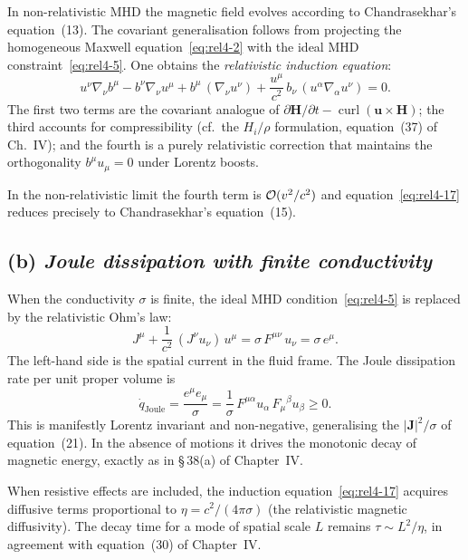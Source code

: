 In non-relativistic MHD the magnetic field evolves according to
Chandrasekhar's equation~(13).  The covariant generalisation follows from
projecting the homogeneous Maxwell equation~\eqref{eq:rel4-2} with the
ideal MHD constraint~\eqref{eq:rel4-5}.  One obtains the \emph{relativistic
induction equation}:
\begin{equation}\label{eq:rel4-17}
  \boxed{
  u^{\nu}\nabla_{\nu}b^{\mu}
  - b^{\nu}\nabla_{\nu}u^{\mu}
  + b^{\mu}\,(\nabla_{\nu}u^{\nu})
  + \frac{u^{\mu}}{c^{2}}\,b_{\nu}\,
    (u^{\alpha}\nabla_{\alpha}u^{\nu}) = 0.
  }
\end{equation}
The first two terms are the covariant analogue of
$\partial\mathbf{H}/\partial t - \operatorname{curl}(\mathbf{u}\times
\mathbf{H})$; the third accounts for compressibility (cf.\ the
$H_{i}/\rho$ formulation, equation~(37) of Ch.~IV); and the fourth is a
purely relativistic correction that maintains the orthogonality
$b^{\mu}u_{\mu}=0$ under Lorentz boosts.

In the non-relativistic limit the fourth term is $\mathcal{O}(v^{2}/c^{2})$
and equation~\eqref{eq:rel4-17} reduces precisely to Chandrasekhar's
equation~(15).

\subsection*{(b) \emph{Joule dissipation with finite conductivity}}

When the conductivity $\sigma$ is finite, the ideal MHD
condition~\eqref{eq:rel4-5} is replaced by the relativistic Ohm's law:
\begin{equation}\label{eq:rel4-18}
  J^{\mu} + \frac{1}{c^{2}}\,(J^{\nu}u_{\nu})\,u^{\mu}
  = \sigma\, F^{\mu\nu}\,u_{\nu}
  = \sigma\, e^{\mu}.
\end{equation}
The left-hand side is the spatial current in the fluid frame.  The Joule
dissipation rate per unit proper volume is
\begin{equation}\label{eq:rel4-19}
  \dot{q}_{\mathrm{Joule}} = \frac{e^{\mu}e_{\mu}}{\sigma}
  = \frac{1}{\sigma}\,F^{\mu\alpha}u_{\alpha}\,F_{\mu}{}^{\beta}u_{\beta}
  \geq 0.
\end{equation}
This is manifestly Lorentz invariant and non-negative, generalising the
$|\mathbf{J}|^{2}/\sigma$ of equation~(21).  In the absence of motions it
drives the monotonic decay of magnetic energy, exactly as in
\S\,38(a) of Chapter~IV.

When resistive effects are included, the induction
equation~\eqref{eq:rel4-17} acquires diffusive terms proportional to
$\eta = c^{2}/(4\pi\sigma)$ (the relativistic magnetic diffusivity).  The
decay time for a mode of spatial scale $L$ remains $\tau\sim L^{2}/\eta$,
in agreement with equation~(30) of Chapter~IV.

